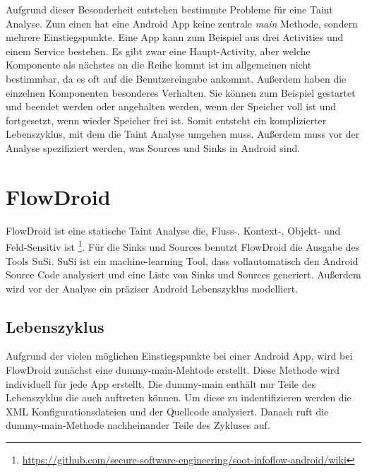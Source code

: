 \documentclass[runningheads]{llncs}
\begin{document}
Aufgrund dieser Besonderheit entstehen bestimmte Probleme für eine Taint Analyse. Zum einen hat eine Android App keine zentrale \emph{main} Methode, sondern mehrere Einstiegspunkte. Eine App kann zum Beispiel aus drei Activities und einem Service bestehen. Es gibt zwar eine Haupt-Activity, aber welche Komponente als nächstes an die Reihe kommt ist im allgemeinen nicht bestimmbar, da es oft auf die Benutzereingabe ankommt. Außerdem haben die einzelnen Komponenten besonderes Verhalten. Sie können zum Beispiel gestartet und beendet werden oder angehalten werden, wenn der Speicher voll ist und fortgesetzt, wenn wieder Speicher frei ist. Somit entsteht ein komplizierter Lebenszyklus, mit dem die Taint Analyse umgehen muss. Außerdem muss vor der Analyse spezifiziert werden, was Sources und Sinks in Android sind.

\section{FlowDroid}\label{sec:flowdroid}
FlowDroid ist eine statische Taint Analyse die, Fluss-, Kontext-, Objekt- und Feld-Sensitiv ist \footnote{\url{https://github.com/secure-software-engineering/soot-infoflow-android/wiki}}.
Für die Sinks und Sources benutzt FlowDroid die Ausgabe des Tools SuSi. SuSi ist ein machine-learning Tool, dass vollautomatisch den Android Source Code analysiert und eine Liste von Sinks und Sources generiert. Außerdem wird vor der Analyse ein präziser Android Lebenszyklus modelliert.
\subsection{Lebenszyklus}
Aufgrund der vielen möglichen Einstiegspunkte bei einer Android App, wird bei FlowDroid zunächst eine dummy-main-Mehtode erstellt. Diese Methode wird individuell für jede App erstellt. Die dummy-main enthält nur Teile des Lebenszyklus die auch auftreten können. Um diese zu indentifizieren werden die XML Konfigurationsdateien und der Quellcode analysiert. Danach ruft die dummy-main-Methode nachheinander Teile des Zykluses auf.
\end{document}
